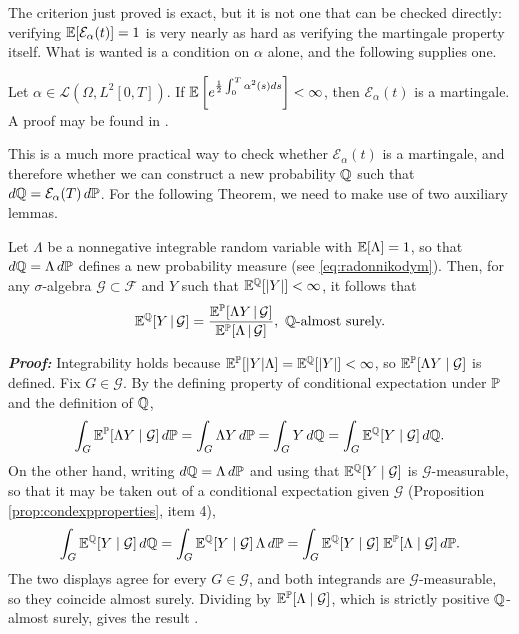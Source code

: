 The criterion just proved is exact, but it is not one that can be checked directly: verifying $\mathbb{E}[\mathcal E _\alpha (t)]= 1$ is very nearly as hard as verifying the martingale property itself. What is wanted is a condition on $\alpha$ alone, and the following supplies one.

\begin{theorem}\label{thm:novikov}
    Let $\alpha \in \mathcal{L}(\Omega, L^2[0,T])$. If $\mathbb{E}\left[ e^{\frac 1 2 \int_0^T \alpha^2(s) ds} \right] < \infty$, then $\mathcal E_\alpha(t)$ is a martingale. A proof may be found in \cite[Sec.~8.7]{kuo2006}. \qedopentext

\end{theorem}

This is a much more practical way to check whether $\mathcal E_\alpha(t)$ is a martingale, and therefore whether we can construct a new probability $\mathbb{Q}$ such that $d\mathbb{Q} = \mathcal E_\alpha(T)\, d\mathbb{P}$. For the following Theorem, we need to make use of two auxiliary lemmas.

\begin{lemma}\label{lem:condexpchange}
    Let $\Lambda$ be a nonnegative integrable random variable with $\mathbb{E}[\Lambda]=1$, so that $d\mathbb{Q} = \Lambda\, d \mathbb{P}$ defines a new probability measure (see \eqref{eq:radonnikodym}). Then, for any $\sigma$-algebra $\mathcal{G} \subset \mathcal{F}$ and $Y$ such that $\mathbb{E}^{\mathbb{Q}}[|Y|] < \infty$, it follows that
    \begin{equation}
        \mathbb{E}^{\mathbb{Q}}[Y \,|\, \mathcal G] = \frac{\mathbb{E}^{\mathbb{P}}[\Lambda Y  \,|\, \mathcal G] }{\mathbb{E}^{\mathbb{P}}[\Lambda \,|\, \mathcal G] }, \, \, \mathbb{Q}\text{-almost surely.}
    \end{equation}
\end{lemma}

\textbf{\textit{Proof:}} Integrability holds because
$\mathbb{E}^{\mathbb{P}}[|Y|\Lambda] = \mathbb{E}^{\mathbb{Q}}[|Y|] < \infty$, so
$\mathbb{E}^{\mathbb{P}}[\Lambda Y\mid\mathcal{G}]$ is defined. Fix $G \in \mathcal{G}$. By the
defining property of conditional expectation under $\mathbb{P}$ and the definition of $\mathbb{Q}$,
\[
\int_G \mathbb{E}^{\mathbb{P}}[\Lambda Y \mid \mathcal{G}]\,d\mathbb{P}
= \int_G \Lambda Y\,d\mathbb{P} = \int_G Y \,d\mathbb{Q}
= \int_G \mathbb{E}^{\mathbb{Q}}[Y\mid\mathcal{G}]\,d\mathbb{Q}.
\]
On the other hand, writing $d\mathbb{Q} = \Lambda\,d\mathbb{P}$ and using that
$\mathbb{E}^{\mathbb{Q}}[Y\mid\mathcal{G}]$ is $\mathcal{G}$-measurable, so that it may be taken
out of a conditional expectation given $\mathcal{G}$ (Proposition
\ref{prop:condexpproperties}, item 4),
\[
\int_G \mathbb{E}^{\mathbb{Q}}[Y\mid\mathcal{G}]\,d\mathbb{Q}
= \int_G \mathbb{E}^{\mathbb{Q}}[Y\mid\mathcal{G}]\,\Lambda\,d\mathbb{P}
= \int_G \mathbb{E}^{\mathbb{Q}}[Y\mid\mathcal{G}]\;\mathbb{E}^{\mathbb{P}}[\Lambda\mid\mathcal{G}]\,d\mathbb{P}.
\]
The two displays agree for every $G \in \mathcal{G}$, and both integrands are
$\mathcal{G}$-measurable, so they coincide almost surely. Dividing by
$\mathbb{E}^{\mathbb{P}}[\Lambda\mid\mathcal{G}]$, which is strictly positive $\mathbb{Q}$-almost
surely, gives the result \cite[Lemma 8.9.2]{kuo2006}. \qedfilledtext

